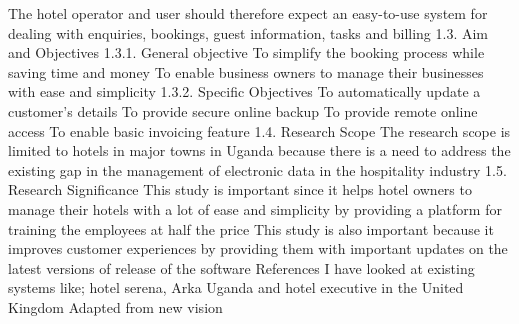 \documentclass{article}
\begin{document}
{The hotel operator and user should therefore expect an easy-to-use system for dealing with enquiries, bookings, guest information, tasks and billing
1.3. Aim and Objectives
1.3.1. General objective To simplify the booking process while saving time and money
To enable business owners to manage their businesses with ease and simplicity
1.3.2. Specific Objectives To automatically update a customer’s details
To provide secure online backup
To provide remote online access
To enable basic invoicing feature
1.4. Research Scope
The research scope is limited to hotels in major towns in Uganda because there is a need to address the existing gap in the management of electronic data in the hospitality industry
1.5. Research Significance
This study is important since it helps hotel owners to manage their hotels with a lot of ease and simplicity by providing a platform for training the employees at half the price
This study is also important because it improves customer experiences by providing them with important updates on the latest versions of release of the software
References
I have looked at existing systems like; hotel serena, Arka Uganda and hotel executive in the United Kingdom
Adapted from new vision
}
\end{document}
